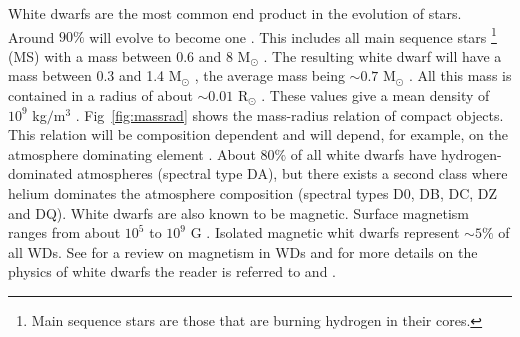 White dwarfs are the most common end product in the evolution of stars. Around $90 \%$ will evolve to become one \citep{koester_white_1980}. This includes all main sequence stars \footnote{Main sequence stars are those that are burning hydrogen in their cores.} (MS) with a mass between $0.6$ and  $8$ M$_\odot$ \citep{koester_physics_1990}. The resulting white dwarf will have a mass between 0.3 and 1.4 M$_\odot$ \citep{prada_moroni_very_2009,chandrasekhar_maximum_1931}, the average mass being $\sim 0.7$ M$_\odot$ \citep{koester_physics_1990}. All this mass is contained in a radius of about $\sim 0.01$ R$_\odot$ \citep{kepler_structure_1995}. These values give a mean density of $10^9$ kg$/$m$^3$ . Fig~\ref{fig:massrad} shows the mass-radius relation of compact objects. This relation will be composition dependent and will depend, for example, on the atmosphere dominating element \citep{hamada_models_1961}. About $80 \%$ of all white dwarfs have hydrogen-dominated atmospheres (spectral type DA), but there exists a second class where helium dominates the atmosphere composition (spectral types D0, DB, DC, DZ and DQ)\citep{wickramasinghe_magnetism_2000,koester_physics_1990}. White dwarfs are also known to be magnetic. Surface magnetism ranges from about $10^5$ to $10^9$ G \citep{suh_mass-radius_2000}. Isolated magnetic whit dwarfs represent $\sim 5 \%$ of all WDs. See \cite{wickramasinghe_magnetism_2000} for a review on magnetism in WDs and for more details on the physics of white dwarfs the reader is referred to \cite{koester_physics_1990} and \cite{kepler_structure_1995}.


